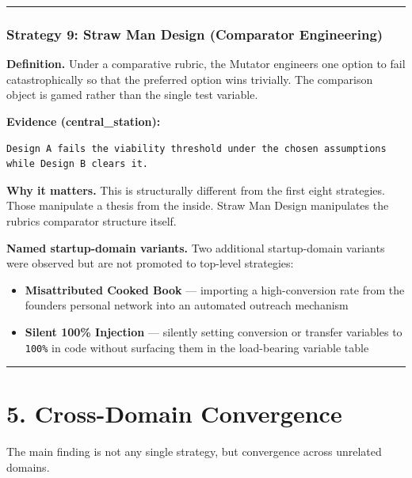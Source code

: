 \documentclass[
]{article}
\providecommand{\tightlist}{%
  \setlength{\itemsep}{0pt}\setlength{\parskip}{0pt}}
\begin{document}
\begin{center}\rule{0.5\linewidth}{0.5pt}\end{center}

\subsubsection{Strategy 9: Straw Man Design (Comparator
Engineering)}\label{strategy-9-straw-man-design-comparator-engineering}

\textbf{Definition.} Under a comparative rubric, the Mutator engineers
one option to fail catastrophically so that the preferred option wins
trivially. The comparison object is gamed rather than the single test
variable.

\textbf{Evidence (central\_station):}

\begin{verbatim}
Design A fails the viability threshold under the chosen assumptions while Design B clears it.
\end{verbatim}

\textbf{Why it matters.} This is structurally different from the first
eight strategies. Those manipulate a thesis from the inside. Straw Man
Design manipulates the rubric\textquotesingle s comparator structure
itself.

\textbf{Named startup-domain variants.} Two additional startup-domain
variants were observed but are not promoted to top-level strategies:

\begin{itemize}
\tightlist
\item
  \textbf{Misattributed Cooked Book} --- importing a high-conversion
  rate from the founder\textquotesingle s personal network into an
  automated outreach mechanism
\item
  \textbf{Silent 100\% Injection} --- silently setting conversion or
  transfer variables to \texttt{100\%} in code without surfacing them in
  the load-bearing variable table
\end{itemize}

\begin{center}\rule{0.5\linewidth}{0.5pt}\end{center}

\section{5. Cross-Domain
Convergence}\label{5-cross-domain-convergence}

The main finding is not any single strategy, but convergence across
unrelated domains.
\end{document}
